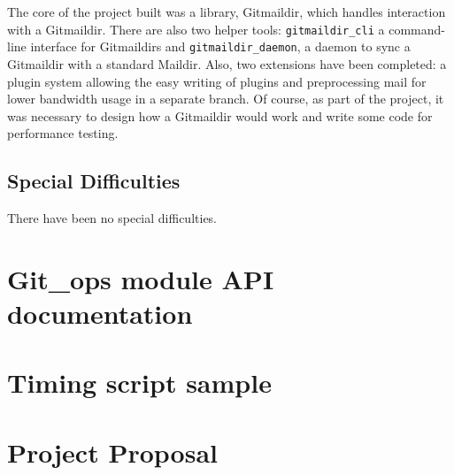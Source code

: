 \documentclass[12pt,a4paper,twoside,openright]{report}
\begin{document}
The core of the project built was a library, Gitmaildir, which handles interaction with a Gitmaildir. There are also two helper tools: \texttt{gitmaildir\_cli} a command-line interface for Gitmaildirs and \texttt{gitmaildir\_daemon}, a daemon to sync a Gitmaildir with a standard Maildir. Also, two extensions have been completed: a plugin system allowing the easy writing of plugins and preprocessing mail for lower bandwidth usage in a separate branch. Of course, as part of the project, it was necessary to design how a Gitmaildir would work and write some code for performance testing.

\section*{Special Difficulties}

There have been no special difficulties.

\newpage

\tableofcontents

\listoffigures

\newpage

\setcounter{page}{1}

\pagestyle{fancy}
\fancyhf{}
\fancyhead[LE,RO]{\thepage}
\fancyhead[RE]{\scshape\small\rightmark}
\fancyhead[LO]{\scshape\small\leftmark}











\printbibliography

\appendix

\chapter{Git\_ops module API documentation} \label{section:docs}


\chapter{Timing script sample} \label{section:bashtiming}



\chapter{Project Proposal}


\end{document}
